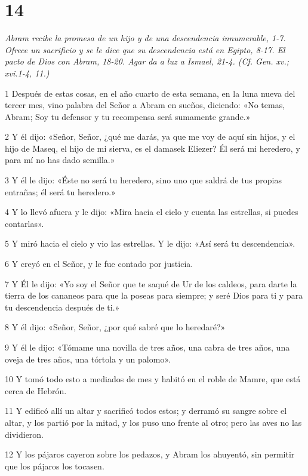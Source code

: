 \chapter{14}

\par \textit{Abram recibe la promesa de un hijo y de una descendencia innumerable, 1-7. Ofrece un sacrificio y se le dice que su descendencia está en Egipto, 8-17. El pacto de Dios con Abram, 18-20. Agar da a luz a Ismael, 21-4. (Cf. Gen. xv.; xvi.1-4, 11.)}


\par 1 Después de estas cosas, en el año cuarto de esta semana, en la luna nueva del tercer mes, vino palabra del Señor a Abram en sueños, diciendo: «No temas, Abram; Soy tu defensor y tu recompensa será sumamente grande.»
\par 2 Y él dijo: «Señor, Señor, ¿qué me darás, ya que me voy de aquí sin hijos, y el hijo de Maseq, el hijo de mi sierva, es el damasek Eliezer? Él será mi heredero, y para mí no has dado semilla.»
\par 3 Y él le dijo: «Éste no será tu heredero, sino uno que saldrá de tus propias entrañas; él será tu heredero.»
\par 4 Y lo llevó afuera y le dijo: «Mira hacia el cielo y cuenta las estrellas, si puedes contarlas».
\par 5 Y miró hacia el cielo y vio las estrellas. Y le dijo: «Así será tu descendencia».
\par 6 Y creyó en el Señor, y le fue contado por justicia.
\par 7 Y Él le dijo: «Yo soy el Señor que te saqué de Ur de los caldeos, para darte la tierra de los cananeos para que la poseas para siempre; y seré Dios para ti y para tu descendencia después de ti.»
\par 8 Y él dijo: «Señor, Señor, ¿por qué sabré que lo heredaré?»
\par 9 Y él le dijo: «Tómame una novilla de tres años, una cabra de tres años, una oveja de tres años, una tórtola y un palomo».
\par 10 Y tomó todo esto a mediados de mes y habitó en el roble de Mamre, que está cerca de Hebrón.
\par 11 Y edificó allí un altar y sacrificó todos estos; y derramó su sangre sobre el altar, y los partió por la mitad, y los puso uno frente al otro; pero las aves no las dividieron.
\par 12 Y los pájaros cayeron sobre los pedazos, y Abram los ahuyentó, sin permitir que los pájaros los tocasen.
